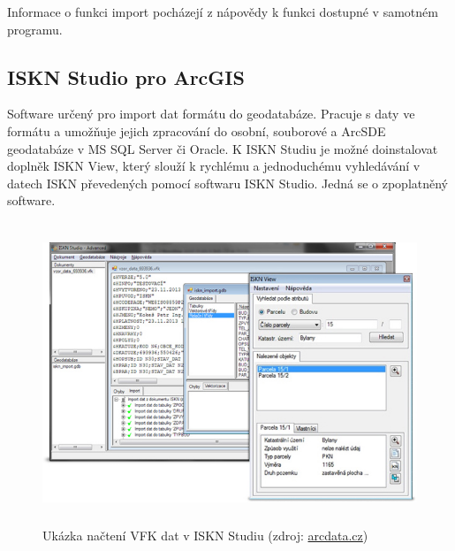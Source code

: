 Informace o funkci import  pocházejí z nápovědy k funkci dostupné v samotném programu.
\subsection{ISKN Studio pro ArcGIS}
Software určený pro import dat formátu  do
geodatabáze. Pracuje s daty ve formátu  a umožňuje jejich
zpracování do osobní, souborové a ArcSDE geodatabáze v MS SQL Server
či Oracle. K ISKN Studiu je možné doinstalovat doplněk ISKN View,
který slouží k rychlému a jednoduchému vyhledávání v datech ISKN
převedených pomocí softwaru ISKN Studio. Jedná se o zpoplatněný
software. \cite{arcgis}

\begin{figure}[H]
	 \centering
      \includegraphics[height=9cm]{./pictures/iskn_studio.jpeg}
      \caption{Ukázka načtení VFK dat v ISKN Studiu (zdroj:
\href{https://www.arcdata.cz/uploads/media/general/0001/01/68f0bfd90cf19d903a57fc8457e1f228a7dd47f4.jpeg}{arcdata.cz})}
      \label{fig:ISKNStudio}
  \end{figure}
